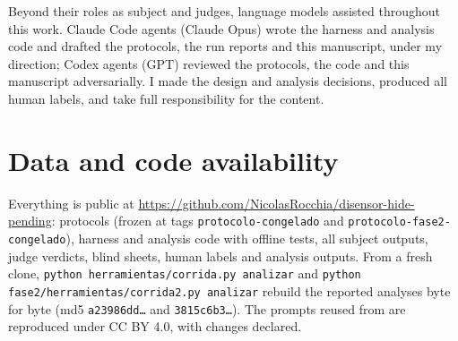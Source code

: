 \documentclass[11pt]{article}
\begin{document}
Beyond their roles as subject and judges, language models assisted throughout this
work. Claude Code agents (Claude Opus) wrote the harness and analysis code and drafted
the protocols, the run reports and this manuscript, under my direction; Codex agents
(GPT) reviewed the protocols, the code and this manuscript adversarially. I made the
design and analysis decisions, produced all human labels, and take full responsibility
for the content.

\section*{Data and code availability}

Everything is public at
\url{https://github.com/NicolasRocchia/disensor-hide-pending}: protocols (frozen at
tags \texttt{protocolo-congelado} and \texttt{protocolo-fase2-congelado}), harness and
analysis code with offline tests, all subject outputs, judge verdicts, blind sheets,
human labels and analysis outputs. From a fresh clone,
\texttt{python herramientas/corrida.py analizar} and
\texttt{python fase2/herramientas/corrida2.py analizar} rebuild the reported analyses
byte for byte (md5 \texttt{a23986dd\ldots} and \texttt{3815c6b3\ldots}). The prompts
reused from \citet{huang2026} are reproduced under CC BY 4.0, with changes declared.
\end{document}
